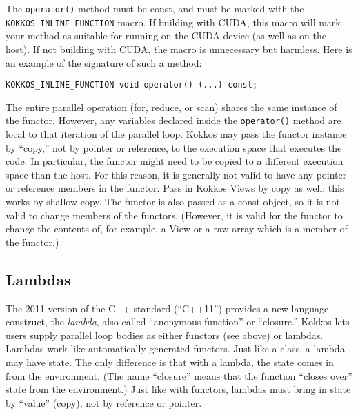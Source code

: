The \lstinline|operator()| method must be const, and must be marked with the \\ \lstinline!KOKKOS_INLINE_FUNCTION! macro.
If building with CUDA, this macro will mark your method as suitable for running on the CUDA device (as well as on the host).
If not building with CUDA, the macro is unnecessary but harmless.  Here is an example of the signature of such a method:
\begin{lstlisting}
KOKKOS_INLINE_FUNCTION void operator() (...) const;
\end{lstlisting}

The entire parallel operation (for, reduce, or scan) shares the same instance of the functor.
However, any variables declared inside the \lstinline!operator()! method are local to that iteration of the parallel loop.
Kokkos may pass the functor instance by ``copy,'' not by pointer or reference, to the execution space that executes the code. 
In particular, the functor might need to be copied to a different execution space than the host.  For this reason, it is generally not valid to have any pointer or reference members in the functor.
Pass in Kokkos Views by copy as well; this works by shallow copy.
The functor is also passed as a const object, so it is not valid to change members of the functors.
(However, it is valid for the functor to change the contents of, for example, a View or a raw array which is a member of the functor.)

\subsection{Lambdas}

The 2011 version of the C++ standard (``C++11'') provides a new language construct, the \emph{lambda}, also called ``anonymous function'' or ``closure.''
Kokkos lets users supply parallel loop bodies as either functors (see above) or lambdas.
Lambdas work like automatically generated functors.
Just like a class, a lambda may have state.  The only difference is that with a lambda, the state comes in from the environment.
(The name ``closure'' means that the function ``closes over'' state from the environment.)
Just like with functors, lambdas must bring in state by ``value'' (copy), not by reference or pointer.

